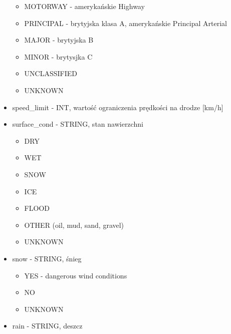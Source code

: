 \begin{itemize}
  \begin{itemize}
  \itemsep-14pt\parskip0pt
  \item
    MOTORWAY - amerykańskie Highway\\
  \item
    PRINCIPAL - brytyjska klasa A, amerykańskie Principal Arterial\\
  \item
    MAJOR - brytyjska B\\
  \item
    MINOR - brytysjka C\\
  \item
    UNCLASSIFIED\\
  \item
    UNKNOWN\\
  \end{itemize}
\item
  speed\_limit - INT, wartość ograniczenia prędkości na drodze
  {[}km/h{]}\\
\item
  surface\_cond - STRING, stan nawierzchni

  \begin{itemize}
  \itemsep-14pt\parskip0pt
  \item
    DRY\\
  \item
    WET\\
  \item
    SNOW\\
  \item
    ICE\\
  \item
    FLOOD\\
  \item
    OTHER (oil, mud, sand, gravel)\\
  \item
    UNKNOWN\\
  \end{itemize}
\item
  snow - STRING, śnieg

  \begin{itemize}
  \itemsep-14pt\parskip0pt
  \item
    YES - dangerous wind conditions\\
  \item
    NO\\
  \item
    UNKNOWN\\
  \end{itemize}
\item
  rain - STRING, deszcz


\end{itemize}

